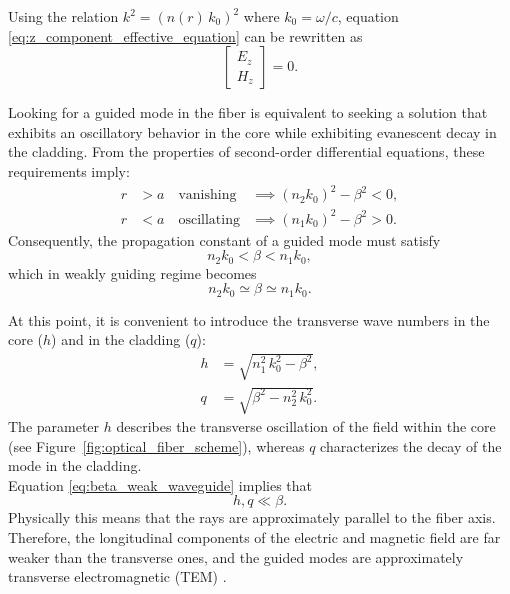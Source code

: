 Using the relation $k^2=(n(r)\,k_0)^2$ where $k_0=\omega/c$, equation \eqref{eq:z_component_effective_equation} can be rewritten as
\begin{equation}
    [\nabla^2_{t}+((n(r)\,k_0)^2 - \beta^2)]
    \begin{bmatrix}
        E_z \\
        H_z
    \end{bmatrix}
    =0.
\end{equation}

Looking for a guided mode in the fiber is equivalent to seeking a solution that exhibits an oscillatory behavior in the core while exhibiting evanescent decay in the cladding. From the properties of second-order differential equations, these requirements imply:
\begin{equation}
    \label{eq:beta_conditions}
    \begin{aligned}
        r &> a \quad \text{vanishing} &\implies (n_2 k_0)^2 - \beta^2 < 0 ,\\
        r &< a \quad \text{oscillating} &\implies (n_1 k_0)^2 - \beta^2 > 0.
    \end{aligned}
\end{equation}
Consequently, the propagation constant of a guided mode must satisfy
\begin{equation}
    \label{eq:n_relation_traditional_fibers}
    n_2k_0 < \beta < n_1k_0,
\end{equation}
which in weakly guiding regime becomes
\begin{equation}
    \label{eq:beta_weak_waveguide}
    n_2k_0 \simeq \beta \simeq n_1k_0.
\end{equation}

At this point, it is convenient to introduce the transverse wave numbers in the core ($h$) and in the cladding ($q$):
\begin{align}
    h &= \sqrt{n_1^2\,k_0^2 - \beta^2}, \\
    q &= \sqrt{\beta^2 - n_2^2\,k_0^2}.
\end{align}
The parameter $h$ describes the transverse oscillation of the field within the core (see Figure~\ref{fig:optical_fiber_scheme}), whereas $q$ characterizes the decay of the mode in the cladding.\\
Equation \eqref{eq:beta_weak_waveguide} implies that
\begin{equation}
    \label{eq:relation_hq_beta}
    h,q \ll \beta.
\end{equation}
Physically this means that the rays are approximately parallel to the fiber axis. Therefore, the longitudinal components of the electric and magnetic field are far weaker than the transverse ones, and the guided modes are approximately transverse electromagnetic (TEM) \cite{salehteich2019}.


